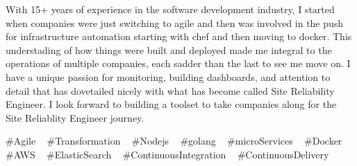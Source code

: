 

\begin{cvparagraph}


With 15+ years of experience in the software development industry, I started when companies were just switching to agile and then
was involved in the push for infrastructure automation starting with chef and then moving to docker.  This understading of how
things were built and deployed made me integral to the operations of multiple companies, each sadder than the last to see me move on.
  I have a unique passion for monitoring, building dashboards, and attention to detail that has dovetailed nicely with what has
become called Site Reliability Engineer.  I look forward to building a toolset to take companies along for the Site Reliablity
Engineer journey.


\end{cvparagraph}
\begin{cvtechnologies}
 \#Agile ~
 \#Transformation ~
 \#Nodejs ~
 \#golang ~
 \#microServices ~
 \#Docker ~
 \#AWS ~
 \#ElasticSearch ~
 \#ContinuousIntegration ~
 \#ContinuousDelivery ~
\end{cvtechnologies}
